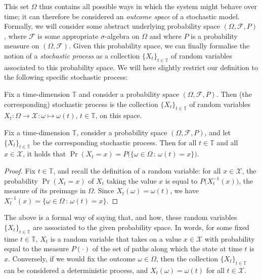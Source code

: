 \documentclass[graybox]{svmult}
\newcommand{\states}{\mathcal{X}}
\newcommand{\timedim}{\mathbb{T}}
\begin{document}
This set $\Omega$ thus contains all possible ways in which the system might behave over time; it can therefore be considered an \emph{outcome space} of a stochastic model. Formally, we will consider some abstract underlying probability space $(\Omega,\mathcal{F},P)$, where $\mathcal{F}$ is some appropriate $\sigma$-algebra on $\Omega$ and where $P$ is a probability measure on $(\Omega,\mathcal{F})$. Given this probability space, we can finally formalise the notion of a \emph{stochastic process} as a collection $\{X_t\}_{t\in\timedim}$ of random variables associated to this probability space. We will here slightly restrict our definition to the following specific stochastic process:
\begin{definition}\label{def:stochastic_process}
Fix a time-dimension $\timedim$ and consider a probability space $(\Omega,\mathcal{F},P)$. Then (the corresponding) stochastic process is the collection $\{X_t\}_{t\in\timedim}$ of random variables $X_t:\Omega\to\states:\omega\mapsto\omega(t)$, $t\in\timedim$, on this space.
\end{definition}
\begin{corollary}\label{cor:process_prob_is_measure}
Fix a time-dimension $\timedim$, consider a probability space $(\Omega,\mathcal{F},P)$, and let $\{X_t\}_{t\in\timedim}$ be the corresponding stochastic process. Then for all $t\in\timedim$ and all $x\in\states$, it holds that $\Pr(X_t=x) = P\bigl( \{\omega\in\Omega\,:\,\omega(t)=x\} \bigr)$.
\end{corollary}
\begin{proof}
Fix $t\in\timedim$, and recall the definition of a random variable: for all $x\in\states$, the probability $\Pr(X_t=x)$ of $X_t$ taking the value $x$ is equal to $P\bigl(X_t^{-1}(x)\bigr)$, the measure of its preimage in $\Omega$. Since $X_t(\omega)=\omega(t)$, we have $X_t^{-1}(x)=\{\omega\in\Omega\,:\,\omega(t)=x\}$.
\end{proof}
The above is a formal way of saying that, and how, these random variables $\{X_t\}_{t\in\timedim}$ are associated to the given probability space. In words, for some fixed time $t\in\timedim$, $X_t$ is a random variable that takes on a value $x\in\states$ with probability equal to the measure $P(\cdot)$ of the set of paths along which the state at time $t$ is $x$. Conversely, if we would fix the outcome $\omega\in\Omega$, then the collection $\{X_t\}_{t\in\timedim}$ can be considered a deterministic process, and $X_t(\omega)=\omega(t)$ for all $t\in\states$.
\end{document}
